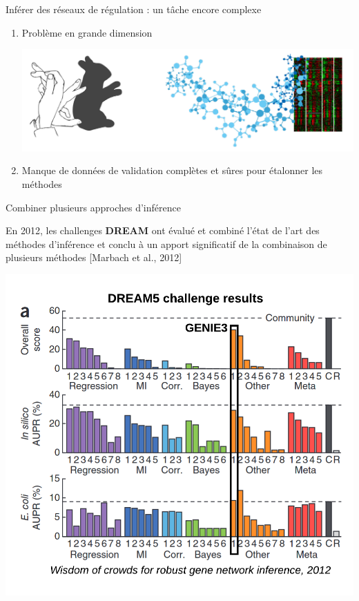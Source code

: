 

\begin{frame}{Inférer des réseaux de régulation : un tâche encore complexe}
	
	\begin{enumerate}
	    \item Problème en grande dimension
	    
	    \includegraphics[scale=0.2]{Figures/Intro/shadowplay.png}
	    
	    
	    \item Manque de données de validation complètes et sûres pour étalonner les méthodes
	\end{enumerate}

\end{frame}




\begin{frame}{Combiner plusieurs approches d'inférence}

\scriptsize En 2012, les challenges \textbf{DREAM} ont évalué et combiné l'état de l'art des méthodes d'inférence  et conclu à un apport significatif de la combinaison de plusieurs méthodes [Marbach et al., 2012]

\centering
\includegraphics[scale = 0.38]{Figures/Regression/dream5.png}
\end{frame}



